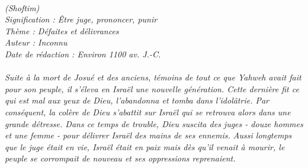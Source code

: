 \BFont
\noindent\hrulefill
{\footnotesize
\textit{
\bigskip
{\centering{}
\\(Shoftim)
\\Signification : Être juge, prononcer, punir
\\Thème : Défaites et délivrances
\\Auteur : Inconnu
\\Date de rédaction : Environ 1100 av. J.-C.\\}
}
\textit{
\\Suite à la mort de Josué et des anciens, témoins de tout ce que Yahweh avait fait pour son peuple, il s’éleva en Israël une nouvelle génération. Cette dernière fit ce qui est mal aux yeux de Dieu, l’abandonna et tomba dans l’idolâtrie. Par conséquent, la colère de Dieu s’abattit sur Israël qui se retrouva alors dans une grande détresse. Dans ce temps de trouble, Dieu suscita des juges - douze hommes et une femme - pour délivrer Israël des mains de ses ennemis. Aussi longtemps que le juge était en vie, Israël était en paix mais dès qu’il venait à mourir, le peuple se corrompait de nouveau et ses oppressions reprenaient.\bigskip
}
}
\par\nobreak\noindent\hrulefill
